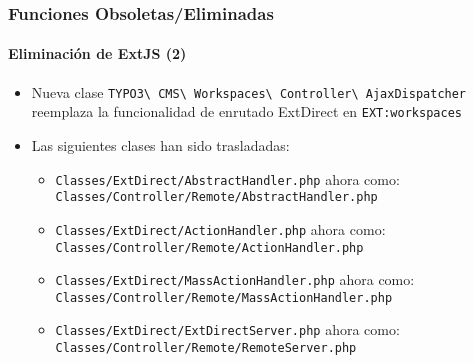 \begin{frame}[fragile]
	\frametitle{Funciones Obsoletas/Eliminadas}
	\framesubtitle{Eliminación de ExtJS (2)}

	\begin{itemize}
		\item Nueva clase
			\texttt{TYPO3\textbackslash
				CMS\textbackslash
				Workspaces\textbackslash
				Controller\textbackslash
				AjaxDispatcher}
			reemplaza la funcionalidad de enrutado ExtDirect en \texttt{EXT:workspaces}

		\item Las siguientes clases han sido trasladadas:

		\begin{itemize}
			\item \smaller\texttt{Classes/ExtDirect/AbstractHandler.php}\newline
				ahora como: \texttt{Classes/Controller/Remote/AbstractHandler.php}\normalsize

			\item \smaller\texttt{Classes/ExtDirect/ActionHandler.php}\newline
				ahora como: \texttt{Classes/Controller/Remote/ActionHandler.php}\normalsize

			\item \smaller\texttt{Classes/ExtDirect/MassActionHandler.php}\newline
				ahora como: \texttt{Classes/Controller/Remote/MassActionHandler.php}\normalsize

			\item \smaller\texttt{Classes/ExtDirect/ExtDirectServer.php}\newline
				ahora como: \texttt{Classes/Controller/Remote/RemoteServer.php}\normalsize

		\end{itemize}

	\end{itemize}

\end{frame}
